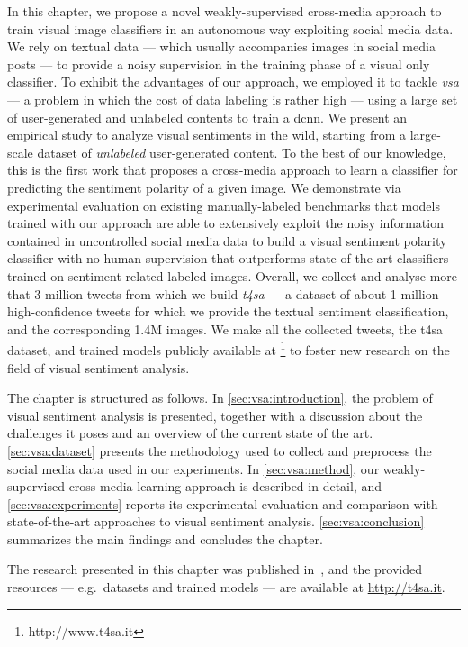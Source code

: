 In this chapter, we propose a novel weakly-supervised cross-media approach to train visual image classifiers in an autonomous way exploiting social media data.
We rely on textual data --- which usually accompanies images in social media posts --- to provide a noisy supervision in the training phase of a visual only classifier.
To exhibit the advantages of our approach, we employed it to tackle \emph{\gls{vsa}} --- a problem in which the cost of data labeling is rather high --- using a large set of user-generated and unlabeled contents to train a \acrfull{dcnn}.
We present an empirical study to analyze visual sentiments in the wild, starting from a large-scale dataset of \emph{unlabeled} user-generated content.
To the best of our knowledge, this is the first work that proposes a cross-media approach to learn a classifier for predicting the sentiment polarity of a given image.
We demonstrate via experimental evaluation on existing manually-labeled benchmarks that models trained with our approach are able to extensively exploit the noisy information contained in uncontrolled social media data to build a visual sentiment polarity classifier with no human supervision that outperforms state-of-the-art classifiers trained on sentiment-related labeled images.
Overall, we collect and analyse more that 3 million tweets from which we build \emph{\acrfull{t4sa}} --- a dataset of about 1 million high-confidence tweets for which we provide the textual sentiment classification, and the corresponding 1.4M images.
We make all the collected tweets, the \gls{t4sa} dataset, and trained models publicly available at \footnote{http://www.t4sa.it} to foster new research on the field of visual sentiment analysis.

The chapter is structured as follows.
In \ref{sec:vsa:introduction}, the problem of visual sentiment analysis is presented, together with a discussion about the challenges it poses and an overview of the current state of the art.
\ref{sec:vsa:dataset} presents the methodology used to collect and preprocess the social media data used in our experiments.
In \ref{sec:vsa:method}, our weakly-supervised cross-media learning approach is described in detail, and \ref{sec:vsa:experiments} reports its experimental evaluation and comparison with state-of-the-art approaches to visual sentiment analysis.
\ref{sec:vsa:conclusion} summarizes the main findings and concludes the chapter.

The research presented in this chapter was published in~\cite{vadicamo2017cross}, and the provided resources --- e.g.\ datasets and trained models --- are available at \url{http://t4sa.it}.


